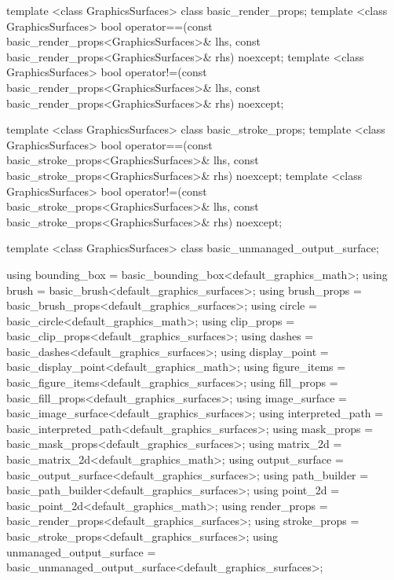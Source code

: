 \begin{codeblock}
{{    template <class GraphicsSurfaces>    
    class basic_render_props;
    template <class GraphicsSurfaces>
    bool operator==(const basic_render_props<GraphicsSurfaces>& lhs,
      const basic_render_props<GraphicsSurfaces>& rhs) noexcept;
    template <class GraphicsSurfaces>
    bool operator!=(const basic_render_props<GraphicsSurfaces>& lhs,
      const basic_render_props<GraphicsSurfaces>& rhs) noexcept;
    
    template <class GraphicsSurfaces>
    class basic_stroke_props;
    template <class GraphicsSurfaces>
    bool operator==(const basic_stroke_props<GraphicsSurfaces>& lhs,
      const basic_stroke_props<GraphicsSurfaces>& rhs) noexcept;
    template <class GraphicsSurfaces>
    bool operator!=(const basic_stroke_props<GraphicsSurfaces>& lhs,
      const basic_stroke_props<GraphicsSurfaces>& rhs) noexcept;
    
    template <class GraphicsSurfaces>
    class basic_unmanaged_output_surface;
  
    using bounding_box = basic_bounding_box<default_graphics_math>;
    using brush = basic_brush<default_graphics_surfaces>;
    using brush_props = basic_brush_props<default_graphics_surfaces>;
    using circle = basic_circle<default_graphics_math>;
    using clip_props = basic_clip_props<default_graphics_surfaces>;
    using dashes = basic_dashes<default_graphics_surfaces>;
    using display_point = basic_display_point<default_graphics_math>;
    using figure_items = basic_figure_items<default_graphics_surfaces>;
    using fill_props = basic_fill_props<default_graphics_surfaces>;
    using image_surface = basic_image_surface<default_graphics_surfaces>;
    using interpreted_path = basic_interpreted_path<default_graphics_surfaces>;
    using mask_props = basic_mask_props<default_graphics_surfaces>;
    using matrix_2d = basic_matrix_2d<default_graphics_math>;
    using output_surface = basic_output_surface<default_graphics_surfaces>;
    using path_builder = basic_path_builder<default_graphics_surfaces>;
    using point_2d = basic_point_2d<default_graphics_math>;
    using render_props = basic_render_props<default_graphics_surfaces>;
    using stroke_props = basic_stroke_props<default_graphics_surfaces>;
    using unmanaged_output_surface = 
      basic_unmanaged_output_surface<default_graphics_surfaces>;
    
}}
\end{codeblock}
